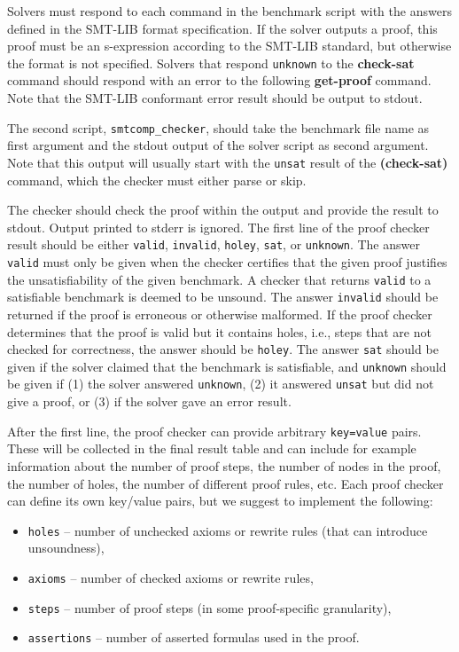 \documentclass[12pt]{article}
\newcommand{\akey}[1]{\textbf{#1}\xspace}
\begin{document}
Solvers must respond to each command in the benchmark script with the
answers defined in the SMT-LIB format specification.  If the solver
outputs a proof, this proof must be an s-expression according to the
SMT-LIB standard, but otherwise the format is not specified.
%
Solvers that respond \texttt{unknown} to the \akey{check-sat} command should
respond with an error to the following \akey{get-proof} command.  Note that the
SMT-LIB conformant error result should be output to stdout.

The second script, \texttt{smtcomp\_checker}, should take
the benchmark file name as first argument and the stdout output of the
solver script as second argument.  Note that this output will
usually start with the \texttt{unsat} result of the \akey{(check-sat)}
command, which the checker must either parse or skip.

The checker should check the proof within the output and provide the result to
stdout.
%
Output printed to stderr is ignored.
%
The first line of the proof checker result should be either \texttt{valid},
\texttt{invalid}, \texttt{holey}, \texttt{sat}, or \texttt{unknown}.
%
The answer \texttt{valid} must only be given when the checker certifies that the
given proof justifies the unsatisfiability of the given benchmark.
%
A checker that returns \texttt{valid} to a satisfiable benchmark is deemed to be
unsound.
%
The answer \texttt{invalid} should be returned if the proof is erroneous or
otherwise malformed.
%
If the proof checker determines that the proof is valid but it contains holes,
i.e., steps that are not checked for correctness, the answer should be
\texttt{holey}.
%
The answer \texttt{sat} should be given if the solver claimed that the benchmark
is satisfiable, and \texttt{unknown} should be given if (1) the solver answered
\texttt{unknown}, (2) it answered \texttt{unsat} but did not give a proof, or
(3) if the solver gave an error result.

After the first line, the proof checker can provide arbitrary
\texttt{key=value} pairs.
%
These will be collected in the final result table and can include for example
information about the number of proof steps, the number of nodes in the proof,
the number of holes, the number of different proof rules, etc.
Each proof checker can define its own key/value pairs, but we suggest
to implement the following:
\begin{itemize}
\item \texttt{holes} -- number of unchecked axioms or rewrite rules (that
  can introduce unsoundness),
\item \texttt{axioms} -- number of checked axioms or rewrite rules,
\item \texttt{steps} -- number of proof steps (in some proof-specific
  granularity),
\item \texttt{assertions} -- number of asserted formulas used in the proof.
\end{itemize}
\end{document}
